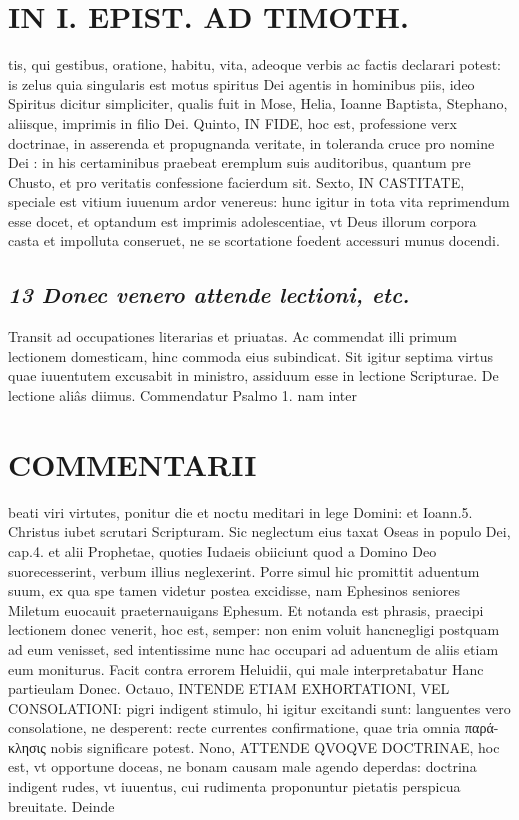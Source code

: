 \documentclass{article}
\begin{document}
\begin{pages}
\section*{IN I. EPIST. AD TIMOTH. }
\marginpar{[ p.109 ]}\pstart tis, qui gestibus, oratione, habitu, vita, adeoque verbis ac factis declarari potest: is zelus quia singularis est motus spiritus Dei agentis in hominibus piis, ideo Spiritus dicitur simpliciter, qualis fuit in Mose, Helia, Ioanne Baptista, Stephano, aliisque, imprimis in filio Dei.  \pend\pstart Quinto, IN FIDE, hoc est, professione verx doctrinae, in asserenda et propugnanda veritate, in toleranda cruce pro nomine Dei : in his certaminibus praebeat eremplum suis auditoribus, quantum pre Chusto, et pro veritatis confessione facierdum sit.  \pend\pstart Sexto, IN CASTITATE, speciale est vitium iuuenum ardor venereus: hunc igitur in tota vita reprimendum esse docet, et optandum est imprimis adolescentiae, vt Deus illorum corpora casta et impolluta conseruet, ne se scortatione foedent accessuri munus docendi.  \pend
{}
{}
\subsection*{\textit{13 Donec venero attende lectioni, etc. }}\pstart Transit ad occupationes literarias et priuatas. Ac commendat illi primum lectionem domesticam, hinc commoda eius subindicat. Sit igitur septima virtus quae iuuentutem excusabit in ministro, assiduum esse in lectione Scripturae. De lectione aliâs diimus. Commendatur Psalmo 1. nam inter  \pend
\section*{COMMENTARII }
\marginpar{[ p.110 ]}\pstart beati viri virtutes, ponitur die et noctu meditari in lege Domini: et Ioann.5. Christus iubet scrutari Scripturam. Sic neglectum eius taxat Oseas in populo Dei, cap.4. et alii Prophetae, quoties Iudaeis obiiciunt quod a Domino Deo suorecesserint, verbum illius neglexerint.  \pend\pstart Porre simul hic promittit aduentum suum, ex qua spe tamen videtur postea excidisse, nam Ephesinos seniores Miletum euocauit praeternauigans Ephesum. Et notanda est phrasis, praecipi lectionem donec venerit, hoc est, semper: non enim voluit hancnegligi postquam ad eum venisset, sed intentissime nunc hac occupari ad aduentum de aliis etiam eum moniturus. Facit contra errorem Heluidii, qui male interpretabatur Hanc partieulam Donec.  \pend\pstart Octauo, INTENDE ETIAM EXHORTATIONI, VEL CONSOLATIONI: pigri indigent stimulo, hi igitur excitandi sunt: languentes vero consolatione, ne desperent: recte currentes confirmatione, quae tria omnia παρά- κλησις nobis significare potest.  \pend\pstart Nono, ATTENDE QVOQVE DOCTRINAE, hoc est, vt opportune doceas, ne bonam causam male agendo deperdas: doctrina indigent rudes, vt iuuentus, cui rudimenta proponuntur pietatis perspicua breuitate. Deinde  \pend

\end{pages}
\end{document}
